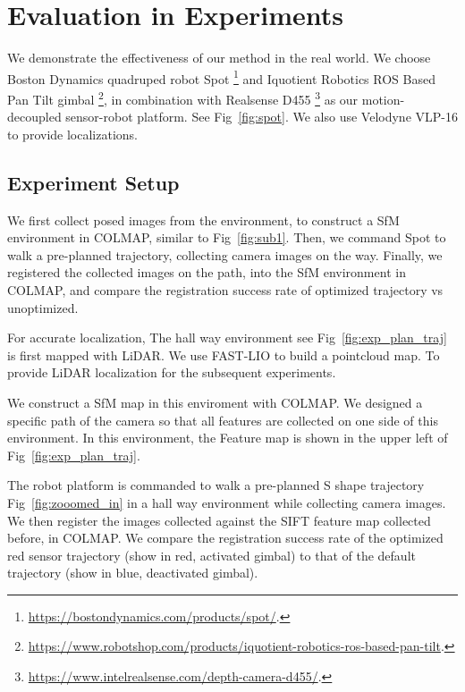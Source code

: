 \documentclass[letterpaper, 10 pt, conference]{ieeeconf}  %
\begin{document}
\section{Evaluation in Experiments}



We demonstrate the effectiveness of our method in the real world. We choose Boston Dynamics quadruped robot Spot \footnote{\href{https://bostondynamics.com/products/spot/}{https://bostondynamics.com/products/spot/}.} and Iquotient Robotics ROS Based Pan Tilt gimbal \footnote{\href{https://www.robotshop.com/products/iquotient-robotics-ros-based-pan-tilt}{https://www.robotshop.com/products/iquotient-robotics-ros-based-pan-tilt}.}, in combination with Realsense D455 \footnote{\href{https://www.intelrealsense.com/depth-camera-d455/}{https://www.intelrealsense.com/depth-camera-d455/}.} as our motion-decoupled sensor-robot platform. See Fig~\ref{fig:spot}. We also use Velodyne VLP-16 to provide localizations.



\subsection{Experiment Setup}
We first collect posed images from the environment, to construct a SfM environment in COLMAP, similar to Fig~\ref{fig:sub1}. Then, we command Spot to walk a pre-planned trajectory, collecting camera images on the way. Finally, we registered the collected images on the path, into the SfM environment in COLMAP, and compare the registration success rate of optimized trajectory vs unoptimized.


For accurate localization, The hall way environment see Fig~\ref{fig:exp_plan_traj} is first mapped with LiDAR. We use FAST-LIO to build a pointcloud map. To provide LiDAR localization for the subsequent experiments.

We construct a SfM map in this enviroment with COLMAP. We designed a specific path of the camera so that all features are collected on one side of this environment. In this environment, the Feature map is shown in the upper left of Fig~\ref{fig:exp_plan_traj}.


The robot platform is commanded to walk a pre-planned S shape trajectory Fig~\ref{fig:zooomed_in} in a hall way environment while collecting camera images. We then register the images collected against the SIFT feature map collected before, in COLMAP. We compare the registration success rate of the optimized red sensor trajectory (show in red, activated gimbal) to that of the default trajectory (show in blue, deactivated gimbal).
\end{document}
